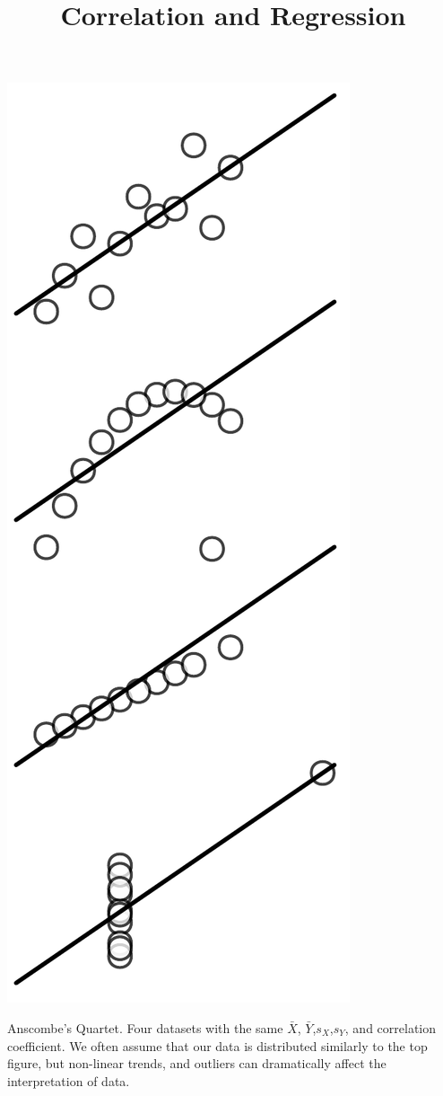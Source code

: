 \documentclass{tufte-handout}
\title{Correlation and Regression}
\date{} %
\begin{document}
\maketitle%

\begin{marginfigure}[10pt]
  \includegraphics[width=\linewidth]{images/handout8_anscombe}%
  \label{fig:fullfig}%
\caption{Anscombe's Quartet. Four datasets with the same $\bar{X}$, $\bar{Y}$,$s_X$,$s_Y$, and correlation coefficient. We often assume that our data is distributed similarly to the top figure, but non-linear trends, and outliers can dramatically affect the interpretation of data.}
\end{marginfigure}
\end{document}
